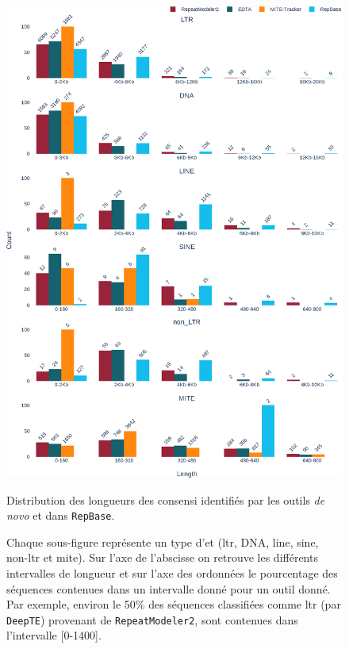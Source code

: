 \documentclass[10pt]{article}
\begin{document}
\begin{figure} 
    \centering
    \includegraphics[width=\textwidth]{img/plots/length_dist.eps}
    \caption{Distribution des longueurs des consensi identifiés par les outils \textit{de novo} et dans \texttt{RepBase}.}
    \caption*{\scriptsize
    Chaque sous-figure représente un type d'\acrshort{et} (\acrshort{ltr}, DNA, \acrshort{line}, \acrshort{sine}, non-\acrshort{ltr} et \acrshort{mite}). Sur l'axe de l'abscisse on retrouve les différents intervalles de longueur et sur l'axe des ordonnées le pourcentage des séquences contenues dans un intervalle donné pour un outil donné. Par exemple, environ le 50\% des séquences classifiées comme \acrshort{ltr} (par \texttt{DeepTE}) provenant de \texttt{RepeatModeler2}, sont contenues dans l'intervalle [0-1400]. 
    }
    \label{fig:dist_length}
\end{figure}
\end{document}
